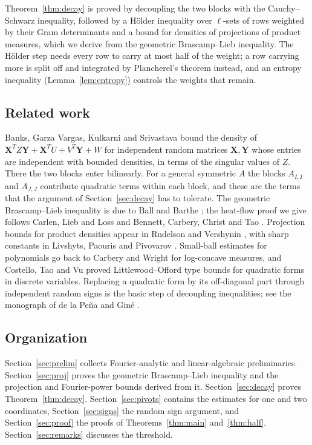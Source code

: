 \documentclass[11pt]{amsart}
\numberwithin{equation}{section}
\theoremstyle{definition}
\theoremstyle{remark}
\newcommand{\1}{\mathbf 1}
\begin{document}
Theorem~\ref{thm:decay} is proved by decoupling the two blocks with the Cauchy--Schwarz inequality, followed by a H\"older inequality over $\ell$-sets of rows weighted by their Gram determinants and a bound for densities of projections of product measures, which we derive from the geometric Brascamp--Lieb inequality. The H\"older step needs every row to carry at most half of the weight; a row carrying more is split off and integrated by Plancherel's theorem instead, and an entropy inequality (Lemma~\ref{lem:entropy}) controls the weights that remain.

\subsection*{Related work}
Banks, Garza Vargas, Kulkarni and Srivastava \cite[Theorem~2.1]{BGKS} bound the density of $\mathbf X^T Z\mathbf Y+\mathbf X^TU+V^T\mathbf Y+W$ for independent random matrices $\mathbf X,\mathbf Y$ whose entries are independent with bounded densities, in terms of the singular values of $Z$. There the two blocks enter bilinearly. For a general symmetric $A$ the blocks $A_{I,I}$ and $A_{J,J}$ contribute quadratic terms within each block, and these are the terms that the argument of Section~\ref{sec:decay} has to tolerate. The geometric Brascamp--Lieb inequality is due to Ball \cite{Ball} and Barthe \cite{Barthe}; the heat-flow proof we give follows Carlen, Lieb and Loss \cite{CLL} and Bennett, Carbery, Christ and Tao \cite{BCCT}. Projection bounds for product densities appear in Rudelson and Vershynin \cite{RV}, with sharp constants in Livshyts, Paouris and Pivovarov \cite{LPP}. Small-ball estimates for polynomials go back to Carbery and Wright \cite{CW} for log-concave measures, and Costello, Tao and Vu \cite{CTV} proved Littlewood--Offord type bounds for quadratic forms in discrete variables. Replacing a quadratic form by its off-diagonal part through independent random signs is the basic step of decoupling inequalities; see the monograph of de la Pe\~na and Gin\'e \cite{DG}.

\subsection*{Organization}
Section~\ref{sec:prelim} collects Fourier-analytic and linear-algebraic preliminaries. Section~\ref{sec:proj} proves the geometric Brascamp--Lieb inequality and the projection and Fourier-power bounds derived from it. Section~\ref{sec:decay} proves Theorem~\ref{thm:decay}. Section~\ref{sec:pivots} contains the estimates for one and two coordinates, Section~\ref{sec:signs} the random sign argument, and Section~\ref{sec:proof} the proofs of Theorems~\ref{thm:main} and~\ref{thm:half}. Section~\ref{sec:remarks} discusses the threshold.
\end{document}
